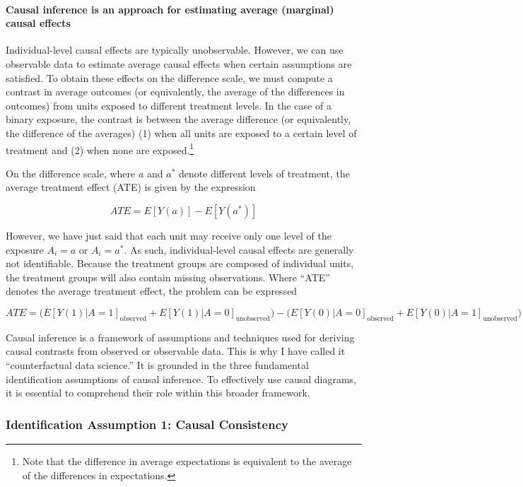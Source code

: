 \documentclass[
  singlecolumn]{article}
\let\oldparagraph\paragraph
\renewcommand{\paragraph}[1]{\oldparagraph{#1}\mbox{}}
\begin{document}
\hypertarget{causal-inference-is-an-approach-for-estimating-average-marginal-causal-effects}{%
\paragraph{Causal inference is an approach for estimating average
(marginal) causal
effects}\label{causal-inference-is-an-approach-for-estimating-average-marginal-causal-effects}}

Individual-level causal effects are typically unobservable. However, we
can use observable data to estimate average causal effects when certain
assumptions are satisfied. To obtain these effects on the difference
scale, we must compute a contrast in average outcomes (or equivalently,
the average of the differences in outcomes) from units exposed to
different treatment levels. In the case of a binary exposure, the
contrast is between the average difference (or equivalently, the
difference of the averages) (1) when all units are exposed to a certain
level of treatment and (2) when none are exposed.\footnote{Note that the
  difference in average expectations is equivalent to the average of the
  differences in expectations.}

On the difference scale, where \(a\) and \(a^*\) denote different levels
of treatment, the average treatment effect (ATE) is given by the
expression

\[
ATE = E[Y(a)] - E[Y(a^*)]
\]

However, we have just said that each unit may receive only one level of
the exposure \(A_i = a\) or \(A_i = a^*\). As such, individual-level
causal effects are generally not identifiable. Because the treatment
groups are composed of individual units, the treatment groups will also
contain missing observations. Where ``ATE'' denotes the average
treatment effect, the problem can be expressed

\[
ATE = \bigg(E[Y(1)|A = 1]_{\text{observed}} + E[Y(1)|A = 0]_{\text{unobserved}}\bigg) - \bigg(E[Y(0)|A = 0]_{\text{observed}}  + E[Y(0)|A = 1]_{\text{unobserved}}\bigg)
\]

Causal inference is a framework of assumptions and techniques used for
deriving causal contrasts from observed or observable data. This is why
I have called it ``counterfactual data science.'' It is grounded in the
three fundamental identification assumptions of causal inference. To
effectively use causal diagrams, it is essential to comprehend their
role within this broader framework.

\hypertarget{identification-assumption-1-causal-consistency}{%
\subsubsection{Identification Assumption 1: Causal
Consistency}\label{identification-assumption-1-causal-consistency}}
\end{document}
